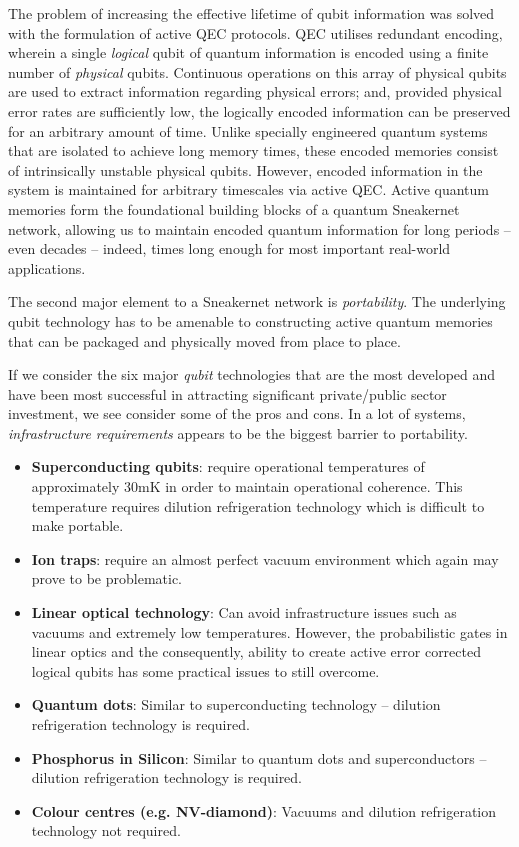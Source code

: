 \documentclass[twocolumn, aps, rmp, amsmath, amssymb, nofootinbib, superscriptaddress, longbibliography, floatfix, table-of-contents, eqsecnum]{revtex4-2}
\begin{document}
The problem of increasing the effective lifetime of qubit information was solved with the formulation of active QEC protocols. QEC utilises redundant encoding, wherein a single \textit{logical} qubit of quantum information is encoded using a finite number of \textit{physical} qubits. Continuous operations on this array of physical qubits are used to extract information regarding physical errors; and, provided physical error rates are sufficiently low, the logically encoded information can be preserved for an arbitrary amount of time. Unlike specially engineered quantum systems that are isolated to achieve long memory times, these encoded memories consist of intrinsically unstable physical qubits. However, encoded information in the system is maintained for arbitrary timescales via active QEC. Active quantum memories form the foundational building blocks of a quantum Sneakernet network, allowing us to maintain encoded quantum information for long periods -- even decades -- indeed, times long enough for most important real-world applications. 

The second major element to a Sneakernet network is \textit{portability}. The underlying qubit technology has to be amenable to constructing active quantum memories that can be packaged and physically moved from place to place. 

If we consider the six major \textit{qubit} technologies that are the most developed and have been most successful in attracting significant private/public sector investment, we see consider some of the pros and cons. In a lot of systems, \textit{infrastructure requirements} appears to be the biggest barrier to portability. 
\begin{itemize}
\item \textbf{Superconducting qubits}: require operational temperatures of approximately 30mK in order to maintain operational coherence. This temperature requires dilution refrigeration technology which is difficult to make portable. 
\item \textbf{Ion traps}: require an almost perfect vacuum environment which again may prove to be problematic. 
\item \textbf{Linear optical technology}: Can avoid infrastructure issues such as vacuums and extremely low temperatures. However, the probabilistic gates in linear optics and the consequently, ability to create active error corrected logical qubits has some practical issues to still overcome. 
\item \textbf{Quantum dots}: Similar to superconducting technology -- dilution refrigeration technology is required.
\item \textbf{Phosphorus in Silicon}: Similar to quantum dots and superconductors -- dilution refrigeration technology is required. 
\item \textbf{Colour centres (e.g. NV-diamond)}: Vacuums and dilution refrigeration technology not required. 
\end{itemize}
\end{document}
